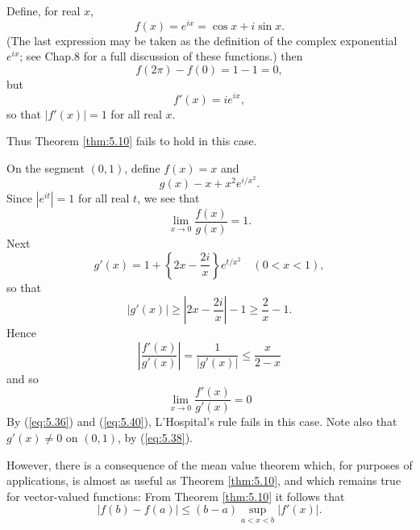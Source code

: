 \begin{newexample}
    Define, for real $x$,
    \begin{equation}
        \label{eq:5.32}
        f(x) = e^{ix} = \cos x + i \sin x.
    \end{equation}
    (The last expression may be taken as the definition of the complex exponential $e^{ix}$; see Chap.8 for a full discussion of these functions.)
    then 
    \begin{equation}
        \label{eq:5.33}
        f(2 \pi) - f(0) = 1 - 1 = 0,
    \end{equation}
    but 
    \begin{equation}
        f'(x) = ie^{ix},
    \end{equation}
    so that $\left| f'(x) \right| = 1$ for all real $x$.

    Thus Theorem \ref{thm:5.10} fails to hold in this case.
\end{newexample}

\begin{newexample}
    On the segment $(0, 1)$, define $f(x) = x$ and 
    \begin{equation}
        g(x) - x + x^2 e^{i/x^2}.
    \end{equation}
    Since $\left| e^{it} \right| = 1$ for all real $t$, we see that 
    \begin{equation}
        \label{eq:5.36}
        \lim_{x \to 0} \frac{f(x)}{g(x)} = 1.
    \end{equation}
    Next 
    \begin{equation}
        \label{eq:5.37}
        g'(x) = 1 + \left\{ 2x - \frac{2i}{x} \right\}e^{t/x^2}
        \quad (0 < x < 1),
    \end{equation}
    so that 
    \begin{equation}
        \label{eq:5.38}
        \left| g'(x) \right| \geq
        \left| 2x - \frac{2i}{x} \right| -1 \geq
        \frac{2}{x} - 1.
    \end{equation}
    Hence 
    \begin{equation}
        \label{eq:5.39}
        \left| \frac{f'(x)}{g'(x)} \right| =
        \frac{1}{\left| g'(x) \right|} \leq
        \frac{x}{2 - x}
    \end{equation}
    and so 
    \begin{equation}
        \label{eq:5.40}
        \lim_{x \to 0} \frac{f'(x)}{g'(x)} = 0
    \end{equation}
    By (\ref{eq:5.36}) and (\ref{eq:5.40}), 
    L'Hospital's rule fails in this case. 
    Note also that $g'(x) \neq 0$ on $(0, 1)$, by (\ref{eq:5.38}).

    However, there is a consequence of the mean value theorem 
    which, for purposes of applications, 
    is almost as useful as Theorem \ref{thm:5.10}, 
    and which remains true for vector-valued functions: 
    From Theorem \ref{thm:5.10} it follows that
    \begin{equation}
        \label{eq:5.41}
        \left| f(b) - f(a) \right| \leq
        (b-a) \sup_{a < x < b} \left| f'(x) \right| .
    \end{equation}
\end{newexample}



